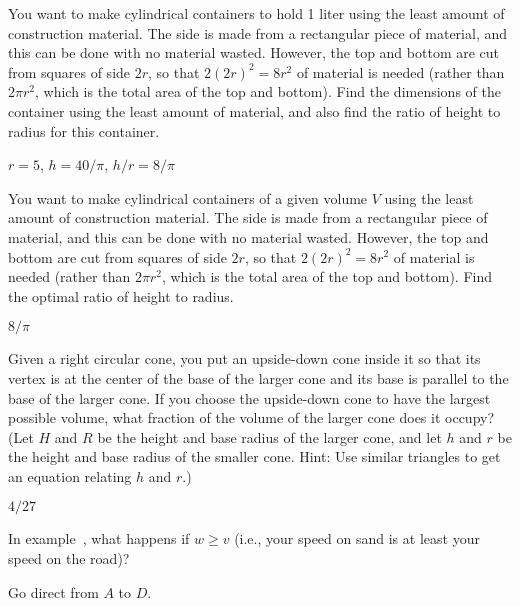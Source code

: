 \begin{exercises}
\begin{exercise}
You want to make cylindrical containers to hold 1 liter using the
least amount of construction material.  The side is made from a
rectangular piece of material, and this can be done with no material
wasted.  However, the top and bottom are cut from squares of side $2r$, so
that $2(2r)^2=8r^2$ of material is needed (rather than $2\pi r^2$, which is
the total area of the top and bottom).  Find the dimensions of the
container using the least amount of material, and also find the
ratio of height to
radius for this container.
\begin{answer} $r=5$, $h=40/\pi$, $h/r=8/\pi$
\end{answer}\end{exercise}

\begin{exercise}
You want to make cylindrical containers of a given volume $V$ using the
least amount of construction material.  The side is made from a
rectangular piece of material, and this can be done with no material
wasted.  However, the top and bottom are cut from squares of side $2r$, so
that $2(2r)^2=8r^2$ of material is needed (rather than $2\pi r^2$, which is
the total area of the top and bottom).  Find the optimal ratio of height to
radius.
\begin{answer} $8/\pi$
\end{answer}\end{exercise}

\begin{exercise}
Given a right circular cone, you put an upside-down cone inside it so that
its vertex is at the center of the base of the larger cone and its base is
parallel to the base of the larger cone.  If you choose the upside-down
cone to have the largest possible volume, what fraction of the volume of
the larger cone does it occupy?  (Let $H$ and $R$ be the height and base
radius of the larger cone, and let $h$ and $r$ be the height and base
radius of the smaller cone.  Hint: Use similar triangles to get an equation
relating $h$ and $r$.)
\begin{answer} $4/27$
\end{answer}\end{exercise}

\begin{exercise}
In example~, what happens if
$w\ge v$ (i.e., your speed on sand is at least your speed on the
road)?
\begin{answer} Go direct from $A$ to $D$.
\end{answer}\end{exercise}


\end{exercises}
